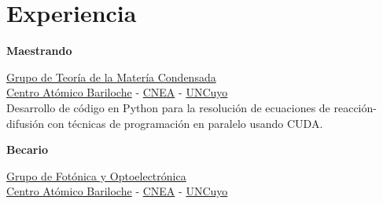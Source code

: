 \documentclass[a4paper,10pt]{article}
\begin{document}
%
\hfill
\begin{adjustbox}{valign=t}
\begin{minipage}{0.02\textwidth} %
\MyVerticalRule  %
\end{minipage}
\end{adjustbox}
\hfill
%
\begin{adjustbox}{valign=t}
\begin{minipage}{0.5\textwidth} %

\section*{Experiencia}
\begin{description}
\raggedright
\item[\normalfont \textcolor{ColorOne}{Ago. 2021 -- Dic. 2022.}] \textbf{Maestrando}\\ \medskip

\href{https://fisica.cab.cnea.gov.ar/solidos/}{\textcolor{ColorTwo}{Grupo de Teoría de la Matería Condensada}} \\ 
\href{https://fisica.cab.cnea.gov.ar/}{\textcolor{ColorTwo}{Centro Atómico Bariloche}} 
\textcolor{ColorTwo}{-} \href{https://www.argentina.gob.ar/cnea}{\textcolor{ColorTwo}{CNEA}} \textcolor{ColorTwo}{-}
\href{https://www.uncuyo.edu.ar/}{\textcolor{ColorTwo}{UNCuyo}}\\

Desarrollo de código en Python para la resolución de ecuaciones de reacción-difusión con técnicas de programación en paralelo usando CUDA. 

\item[\normalfont \textcolor{ColorOne}{May. 2021 -- Sep. 2021.}] \textbf{Becario}\\ \medskip

\href{https://fisica.cab.cnea.gov.ar/pop/}{\textcolor{ColorTwo}{Grupo de Fotónica y Optoelectrónica}} \\ 
\href{https://fisica.cab.cnea.gov.ar/}{\textcolor{ColorTwo}{Centro Atómico Bariloche}} 
\textcolor{ColorTwo}{-} \href{https://www.argentina.gob.ar/cnea}{\textcolor{ColorTwo}{CNEA}} \textcolor{ColorTwo}{-}
\href{https://www.uncuyo.edu.ar/}{\textcolor{ColorTwo}{UNCuyo}}\\
	

\end{description}
\end{minipage}
\end{adjustbox}
\end{document}
